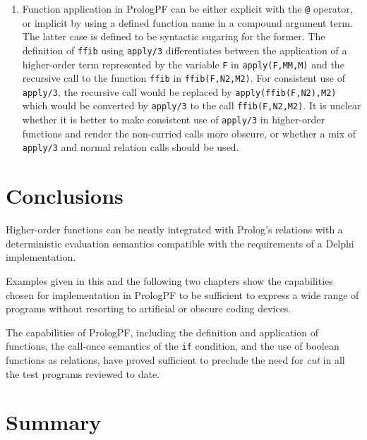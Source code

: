 \begin{enumerate}
{\begin{enumerate}
{    anywhere as a valid argument term, and will be reduced before the term
    is unified with the corresponding formal argument.}
  \item{Function application in PrologPF can be either explicit with the
    \texttt{@} operator, or implicit by using a defined function name in
    a compound argument term.  The latter case is defined to be syntactic
    sugaring for the former.  The definition of \texttt{ffib} using 
    \texttt{apply/3} differentiates between the application of a higher-order
    term represented by the variable \texttt{F} in \texttt{apply(F,MM,M)} and
    the recursive call to the function \texttt{ffib} in \texttt{ffib(F,N2,M2)}.
    For consistent use of \texttt{apply/3}, the recursive call would be
    replaced by \texttt{apply(ffib(F,N2),M2)} which would be converted by
    \texttt{apply/3} to the call \texttt{ffib(F,N2,M2)}.  It is unclear whether
    it is better to make consistent use of \texttt{apply/3} in higher-order
    functions and render the non-curried calls more obscure, or whether a mix
    of \texttt{apply/3} and normal relation calls should be used.}
  \end{enumerate}}
\end{enumerate}

\section{Conclusions} %

Higher-order functions can be neatly integrated with Prolog's relations
with a deterministic evaluation semantics compatible with the requirements
of a Delphi implementation.

Examples given in this and the following two chapters show the capabilities
chosen for implementation in PrologPF to be sufficient to express a wide range
of programs without resorting to artificial or obscure coding devices.

The capabilities of PrologPF, including the definition and application of
functions, the call-once semantics of the \texttt{if} condition, and the
use of boolean functions as relations, have proved sufficient to preclude the
need for \textit{cut} in all the test programs reviewed to date.

\section{Summary} %

